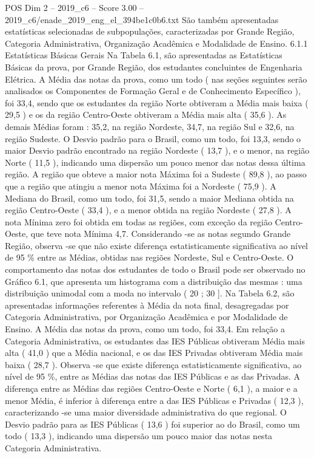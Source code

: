 \begin{textsample}{POS Dim 2 – 2019\_c6 – Score 3.00 – 2019\_c6/enade\_2019\_eng\_el\_394be1c0b6.txt}
São também apresentadas estatísticas selecionadas de subpopulações, caracterizadas por Grande Região, Categoria Administrativa, Organização Acadêmica e Modalidade de Ensino. 6.1.1 Estatísticas Básicas Gerais Na Tabela 6.1, são apresentadas as Estatísticas Básicas da prova, por Grande Região, dos estudantes concluintes de Engenharia Elétrica.
A Média das notas da prova, como um todo ( nas seções seguintes serão analisados os Componentes de Formação Geral e de Conhecimento Específico ), foi 33,4, sendo que os estudantes da região Norte obtiveram a Média mais baixa ( 29,5 ) e os da região Centro-Oeste obtiveram a Média mais alta ( 35,6 ).
As demais Médias foram : 35,2, na região Nordeste, 34,7, na região Sul e 32,6, na região Sudeste.
O Desvio padrão para o Brasil, como um todo, foi 13,3, sendo o maior Desvio padrão encontrado na região Nordeste ( 13,7 ), e o menor, na região Norte ( 11,5 ), indicando uma dispersão um pouco menor das notas dessa última região.
A região que obteve a maior nota Máxima foi a Sudeste ( 89,8 ), ao passo que a região que atingiu a menor nota Máxima foi a Nordeste ( 75,9 ).
A Mediana do Brasil, como um todo, foi 31,5, sendo a maior Mediana obtida na região Centro-Oeste ( 33,4 ), e a menor obtida na região Nordeste ( 27,8 ).
A nota Mínima zero foi obtida em todas as regiões, com exceção da região Centro-Oeste, que teve nota Mínima 4,7.
Considerando -se as notas segundo Grande Região, observa -se que não existe diferença estatisticamente significativa ao nível de 95 \% entre as Médias, obtidas nas regiões Nordeste, Sul e Centro-Oeste.
O comportamento das notas dos estudantes de todo o Brasil pode ser observado no Gráfico 6.1, que apresenta um histograma com a distribuição das mesmas : uma distribuição unimodal com a moda no intervalo ( 20 ; 30 ].
Na Tabela 6.2, são apresentadas informações referentes à Média da nota final, desagregadas por Categoria Administrativa, por Organização Acadêmica e por Modalidade de Ensino.
A Média das notas da prova, como um todo, foi 33,4.
Em relação a Categoria Administrativa, os estudantes das IES Públicas obtiveram Média mais alta ( 41,0 ) que a Média nacional, e os das IES Privadas obtiveram Média mais baixa ( 28,7 ).
Observa -se que existe diferença estatisticamente significativa, ao nível de 95 \%, entre as Médias das notas das IES Públicas e as das Privadas.
A diferença entre as Médias das regiões Centro-Oeste e Norte ( 6,1 ), a maior e a menor Média, é inferior à diferença entre a das IES Públicas e Privadas ( 12,3 ), caracterizando -se uma maior diversidade administrativa do que regional.
O Desvio padrão para as IES Públicas ( 13,6 ) foi superior ao do Brasil, como um todo ( 13,3 ), indicando uma dispersão um pouco maior das notas nesta Categoria Administrativa.

\end{textsample}
